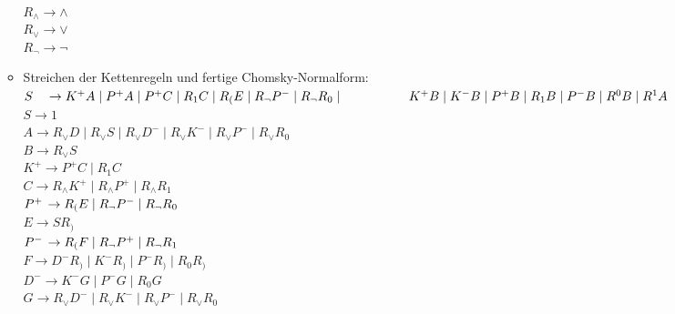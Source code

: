 \documentclass[11pt]{article}
\begin{document}
\begin{enumerate}
\begin{itemize}
\\\hspace*{6mm} $R_{\wedge} \rightarrow \wedge$
\\\hspace*{6mm} $R_{\vee} \rightarrow \vee$
\\\hspace*{6mm} $R_{\neg} \rightarrow \neg$
\item \hspace*{6mm} Streichen der Kettenregeln und fertige Chomsky-Normalform:
\\\hspace*{6mm} $S \hspace{3,5mm}\rightarrow K^{+} A\mid P^{+}A \mid P^{+}C \mid R_{1}C \mid R_{(}E \mid R_{\neg}P^{-} \mid  R_{\neg}R_{0} \mid \hspace*{18mm}K^{+}B \mid K^{-}B \mid P^{+}B \mid R_{1}B \mid P^{-}B \mid R^{0}B \mid R^{1}A$
\\\hspace*{6mm} $S \rightarrow 1$
\\\hspace*{6mm} $A \rightarrow R_{\vee}D \mid R_{\vee}S \mid R_{\vee}D^{-} \mid R_{\vee}K^{-} \mid R_{\vee}P^{-} \mid R_{\vee}R_{0}$
\\\hspace*{6mm} $B \rightarrow R_{\vee}S$
\\\hspace*{6mm} $K^{+} \rightarrow P^{+}C \mid R_{1}C$
\\\hspace*{6mm} $C \rightarrow R_{\wedge}K^{+} \mid R_{\wedge}P^{+} \mid R_{\wedge}R_{1}$
\\\hspace*{6mm} $P^{+} \hspace{0,5mm}\rightarrow R_{(}E\mid R_{\neg} P^{-} \mid R_{\neg}R_{0}$
\\\hspace*{6mm} $E \rightarrow SR_{)}$
\\\hspace*{6mm} $P^{-} \hspace{0,5mm}\rightarrow R_{(}F\mid R_{\neg}P^{+} \mid R_{\neg}R_{1}$
\\\hspace*{6mm} $F \rightarrow D^{-}R_{)} \mid K^{-}R_{)} \mid P^{-}R_{)} \mid R_{0}R_{)}$
\\\hspace*{6mm} $D^{-} \rightarrow K^{-}G \mid P^{-}G \mid R_{0}G$
\\\hspace*{6mm} $G \rightarrow R_{\vee}D^{-} \mid R_{\vee}K^{-} \mid R_{\vee}P^{-} \mid R_{\vee}R_{0}$

\end{itemize}
\end{enumerate}
\end{document}
